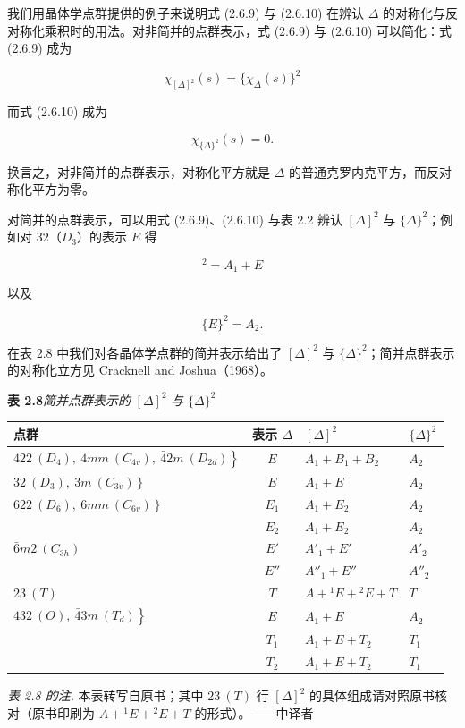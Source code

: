 我们用晶体学点群提供的例子来说明式 (2.6.9) 与 (2.6.10) 在辨认 $\Delta$ 的对称化与反对称化乘积时的用法。对非简并的点群表示，式 (2.6.9) 与 (2.6.10) 可以简化：式 (2.6.9) 成为

\begin{equation*}
\chi_{[\Delta]^{2}}(s) = \{\chi_{\Delta}(s)\}^{2}
\tag{2.6.12}
\end{equation*}

而式 (2.6.10) 成为

\begin{equation*}
\chi_{\{\Delta\}^{2}}(s) = 0.
\tag{2.6.13}
\end{equation*}

换言之，对非简并的点群表示，对称化平方就是 $\Delta$ 的普通克罗内克平方，而反对称化平方为零。

对简并的点群表示，可以用式 (2.6.9)、(2.6.10) 与表 2.2 辨认 $[\Delta]^{2}$ 与 $\{\Delta\}^{2}$；例如对 $32$（$D_{3}$）的表示 $E$ 得

\begin{equation*}
[E]^{2} = A_{1} + E
\tag{2.6.14}
\end{equation*}

以及

\begin{equation*}
\{E\}^{2} = A_{2}.
\tag{2.6.15}
\end{equation*}

在表 2.8 中我们对各晶体学点群的简并表示给出了 $[\Delta]^{2}$ 与 $\{\Delta\}^{2}$；简并点群表示的对称化立方见 Cracknell and Joshua（1968）。

\begin{table}[H]
\centering
\textbf{表 2.8}\quad \textit{简并点群表示的} $[\Delta]^{2}$ \textit{与} $\{\Delta\}^{2}$

\smallskip
\begin{tabular}{|l|c|l|l|}
\hline
点群 & 表示 $\Delta$ & $[\Delta]^{2}$ & $\{\Delta\}^{2}$ \\ \hline
$\left.422\ (D_{4}),\ 4mm\ (C_{4v}),\ \bar{4}2m\ (D_{2d})\right\}$ & $E$ & $A_{1} + B_{1} + B_{2}$ & $A_{2}$ \\ \hline
$\left.32\ (D_{3}),\ 3m\ (C_{3v})\right\}$ & $E$ & $A_{1} + E$ & $A_{2}$ \\ \hline
$\left.622\ (D_{6}),\ 6mm\ (C_{6v})\right\}$ & $E_{1}$ & $A_{1} + E_{2}$ & $A_{2}$ \\ \hline
 & $E_{2}$ & $A_{1} + E_{2}$ & $A_{2}$ \\ \hline
$\bar{6}m2\ (C_{3h})$ & $E'$ & $A'_{1} + E'$ & $A'_{2}$ \\ \hline
 & $E''$ & $A''_{1} + E''$ & $A''_{2}$ \\ \hline
$23\ (T)$ & $T$ & $A + {}^{1}E + {}^{2}E + T$ & $T$ \\ \hline
$\left.432\ (O),\ \bar{4}3m\ (T_{d})\right\}$ & $E$ & $A_{1} + E$ & $A_{2}$ \\ \hline
 & $T_{1}$ & $A_{1} + E + T_{2}$ & $T_{1}$ \\ \hline
 & $T_{2}$ & $A_{1} + E + T_{2}$ & $T_{1}$ \\ \hline
\end{tabular}

\end{table}

\smallskip\noindent\textit{表 2.8 的注.} 本表转写自原书；其中 $23\ (T)$ 行 $[\Delta]^{2}$ 的具体组成请对照原书核对（原书印刷为 $A + {}^{1}E + {}^{2}E + T$ 的形式）。——中译者
